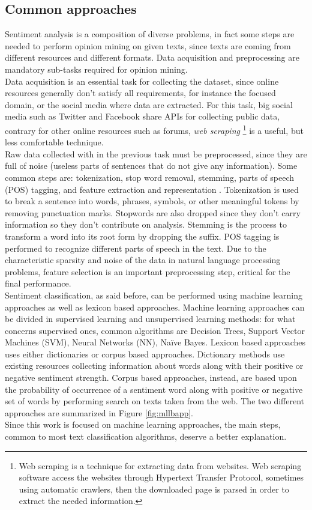 \subsection{Common approaches}

Sentiment analysis is a composition of diverse problems, in fact some steps are needed to perform opinion mining on given texts, since texts are coming from different resources and different formats. Data acquisition and preprocessing are mandatory sub-tasks required for opinion mining.\\
Data acquisition is an essential task for collecting the dataset, since online resources generally don't satisfy all requirements, for instance the focused domain, or the social media where data are extracted. For this task, big social media such as Twitter and Facebook share APIs for collecting public data, contrary for other online resources such as forums, \textit{web scraping} \footnote{Web scraping is a technique for extracting data from websites. Web scraping software access the websites through Hypertext Transfer Protocol, sometimes using automatic crawlers, then the downloaded page is parsed in order to extract the needed information.} is a useful, but less comfortable technique.\\
Raw data collected with in the previous task must be preprocessed, since they are full of noise (useless parts of sentences that do not give any information). Some common steps are: tokenization, stop word removal, stemming, parts of speech (POS) tagging, and feature extraction and
representation \cite{RAVI201514}. Tokenization is used to break a sentence into words, phrases, symbols, or other meaningful tokens by removing punctuation marks. Stopwords are also dropped since they don't carry information so they don't contribute on analysis. Stemming is the process to transform a word into its root form by dropping the suffix. POS tagging is performed to recognize different parts of speech in the text. Due to the characteristic sparsity and noise of the data in natural language processing problems, feature selection is an important preprocessing step, critical for the final performance.\\
Sentiment classification, as said before, can be performed using machine learning approaches as well as lexicon based approaches. Machine learning approaches can be divided in supervised learning and unsupervised learning methods: for what concerns supervised ones, common algorithms are Decision Trees, Support Vector Machines (SVM), Neural Networks (NN), Na{\"i}ve Bayes. Lexicon based approaches uses either dictionaries or corpus based approaches. Dictionary methods use existing resources collecting information about words along with their positive or negative sentiment strength. Corpus based approaches, instead, are based upon the probability of occurrence of a sentiment word along with positive or negative set of words by performing search on texts taken from the web. The two different approaches are summarized in Figure \ref{fig:mllbapp}.\\
Since this work is focused on machine learning approaches, the main steps, common to most text classification algorithms, deserve a better explanation.

